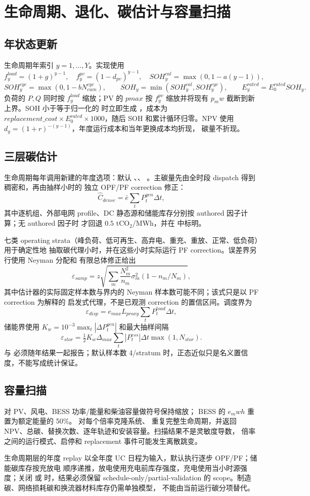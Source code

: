 \section{生命周期、退化、碳估计与容量扫描}
\label{sec:lifecycle}

\subsection{年状态更新}
生命周期年索引 $y=1,\ldots,Y$。实现使用
\[
 f^{load}_y=(1+g)^{y-1},\quad f^{pv}_y=(1-d_{pv})^{y-1},\quad
 SOH^{cal}_y=\max(0,1-a(y-1)),
\]
\[
 SOH^{cyc}_y=\max(0,1-bN^{cyc}_{cum}),\qquad
 SOH_y=\min(SOH^{cal}_y,SOH^{cyc}_y),\qquad
 E^{rated}_y=E^{rated}_0SOH_y.
\]
负荷的 $P,Q$ 同时按 $f^{load}_y$ 缩放；PV 的 $pmax$ 按 $f^{pv}_y$ 缩放并将现有 $p_mw$
截断到新上界。SOH 小于等于归一化的  时立即生成
，成本为 $replacement\_cost\times E^{rated}_0\times1000$，随后
SOH 和累计循环归零。NPV 使用 $d_y=(1+r)^{-(y-1)}$，年度运行成本和当年更换成本均折现，
碳量不折现。

\subsection{三层碳估计}
生命周期每年调用新建的年度选项：默认 、、
。主碳量先由全时段 dispatch 得到稠密和，再由抽样小时的
独立 OPF/PF correction 修正：
\[
 \widehat C_{dense}=\bar e\sum_t P^{gen}_t\Delta t,
\]
其中逐机组、外部电网 profile、DC 静态源和储能库存分别按 authored 因子计算；无 authored 因子时
才回退 $0.5$ tCO$_2$/MWh，并在  中标明。

七类 operating strata（峰负荷、低可再生、高弃电、重充、重放、正常、低负荷）用于确定性地
抽取碳代理小时，并在这些小时实际运行 PF correction。误差界另行使用 Neyman 分配和
有限总体修正给出
\[
 \varepsilon_{samp}=z\sqrt{\sum_m\frac{N_m^2}{n_m}\sigma_m^2
 (1-n_m/N_m)},
\]
其中估计器的实际固定样本数与界内的 Neyman 样本数可能不同；该式只是以 PF correction 为解释的
启发式代理，不是已观测 correction 的置信区间。调度界为
\[
 \varepsilon_{disp}=e_{max}L_{proxy}\sum_tP^{load}_t\Delta t,
\]
储能界使用 $K_w=10^{-3}\max_t|\Delta P^{gen}_t|$ 和最大抽样间隔
\[
 \varepsilon_{stor}=\tfrac12K_w\Delta_{max}\sum_t|P^{ess}_t|\Delta t\max(1,N_{stor}).
\]
 与  必须随年结果一起报告；默认样本数 4/stratum
时，正态近似只是名义置信度，不能写成统计保证。

\subsection{容量扫描}
 对 PV、风电、BESS 功率/能量和柴油容量做符号保持缩放；
BESS 的 $e_mwh$ 重置为额定能量的 50\%。 对每个倍率克隆系统、
重复完整生命周期，并返回 NPV、总碳、替换次数、逐年轨迹和安装容量。扫描结果不是灵敏度导数，
倍率之间的运行模式、启停和 replacement 事件可能发生离散跳变。

\begin{gapnote}
生命周期层的年度 replay 以全年度 UC 日程为输入，默认执行逐步 OPF/PF；储能碳库存按充放电
顺序递推，放电使用充电前库存强度，充电使用当小时源强度；关闭
 或  时，结果必须保留
schedule-only/partial-validation 的 scope。制造碳、网络损耗碳和换流器材料库存仍需单独模型，
不能由当前运行碳分项替代。
\end{gapnote}

